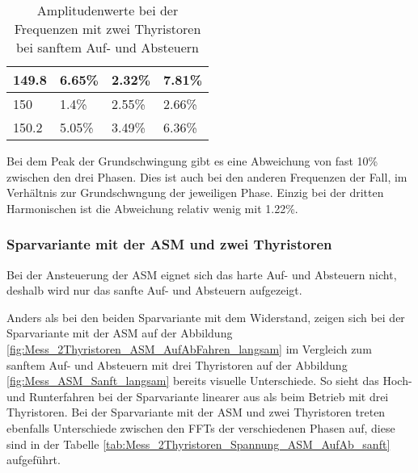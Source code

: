 \begin{table}[ht!]
\begin{tabular}{|l|l|l|l|}
		149.8             & 6.65\%                                                                              & 2.32\%                                                                              & 7.81\%                                                                              \\ \hline
		150               & 1.4\%                                                                               & 2.55\%                                                                              & 2.66\%                                                                              \\ \hline
		150.2             & 5.05\%                                                                              & 3.49\%                                                                              & 6.36\%                                                                              \\ \hline
	\end{tabular}
\caption{Amplitudenwerte bei der Frequenzen mit zwei Thyristoren bei sanftem Auf- und Absteuern}\label{tab:Mess_2Thyristoren_Spannung_Widerstand_AufAb_sanft}
\end{table}


Bei dem Peak der Grundschwingung gibt es eine Abweichung von fast 10\% zwischen den drei Phasen. Dies ist auch bei den anderen Frequenzen der Fall, im Verhältnis zur Grundschwngung der jeweiligen Phase. Einzig bei der dritten Harmonischen ist die Abweichung relativ wenig mit 1.22\%. 

\newpage

\newpage
\subsubsection{Sparvariante mit der ASM und zwei Thyristoren}
Bei der Ansteuerung der ASM eignet sich das harte Auf- und Absteuern nicht, deshalb wird nur das sanfte Auf- und Absteuern aufgezeigt.


Anders als bei den beiden Sparvariante mit dem Widerstand, zeigen sich bei der Sparvariante mit der ASM auf der Abbildung \ref{fig:Mess_2Thyristoren_ASM_AufAbFahren_langsam} im Vergleich zum sanftem Auf- und Absteuern mit drei Thyristoren auf der Abbildung \ref{fig:Mess_ASM_Sanft_langsam} bereits visuelle Unterschiede. So sieht das Hoch- und Runterfahren bei der Sparvariante linearer aus als beim Betrieb mit drei Thyristoren. Bei der Sparvariante mit der ASM und zwei Thyristoren treten ebenfalls Unterschiede zwischen den FFTs der verschiedenen Phasen auf, diese sind in der Tabelle \ref{tab:Mess_2Thyristoren_Spannung_ASM_AufAb_sanft} aufgeführt. 


